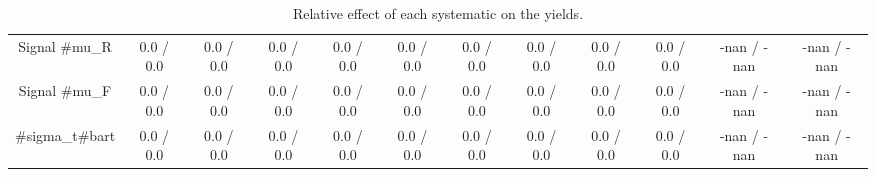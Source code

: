 \begin{table}[htbp]
\begin{center}
\begin{tabular}{|c|c|c|c|c|c|c|c|c|c|c|c|}
  Signal #mu_{R} & 0.0 / 0.0 & 0.0 / 0.0 & 0.0 / 0.0 & 0.0 / 0.0 & 0.0 / 0.0 & 0.0 / 0.0 & 0.0 / 0.0 & 0.0 / 0.0 & 0.0 / 0.0 & -nan / -nan & -nan / -nan \\ 
  Signal #mu_{F} & 0.0 / 0.0 & 0.0 / 0.0 & 0.0 / 0.0 & 0.0 / 0.0 & 0.0 / 0.0 & 0.0 / 0.0 & 0.0 / 0.0 & 0.0 / 0.0 & 0.0 / 0.0 & -nan / -nan & -nan / -nan \\ 
  #sigma_{t#bar{t}} & 0.0 / 0.0 & 0.0 / 0.0 & 0.0 / 0.0 & 0.0 / 0.0 & 0.0 / 0.0 & 0.0 / 0.0 & 0.0 / 0.0 & 0.0 / 0.0 & 0.0 / 0.0 & -nan / -nan & -nan / -nan \\ 
\hline 
\end{tabular} 
\caption{Relative effect of each systematic on the yields.} 
\end{center} 
\end{table} 
